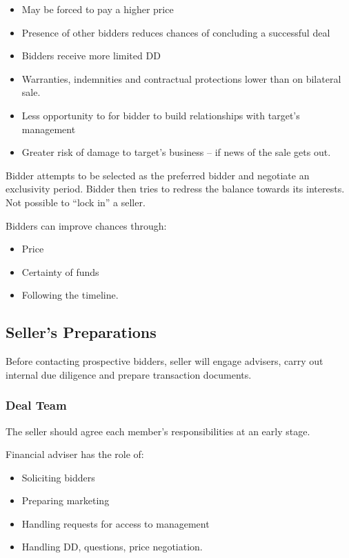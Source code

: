 \documentclass[
]{article}
\providecommand{\tightlist}{%
  \setlength{\itemsep}{0pt}\setlength{\parskip}{0pt}}
\begin{document}
\begin{itemize}
\tightlist
\item
  May be forced to pay a higher price
\item
  Presence of other bidders reduces chances of concluding a successful
  deal
\item
  Bidders receive more limited DD
\item
  Warranties, indemnities and contractual protections lower than on
  bilateral sale.
\item
  Less opportunity to for bidder to build relationships with target's
  management
\item
  Greater risk of damage to target's business -- if news of the sale
  gets out.
\end{itemize}

Bidder attempts to be selected as the preferred bidder and negotiate an
exclusivity period. Bidder then tries to redress the balance towards its
interests. Not possible to ``lock in'' a seller.

Bidders can improve chances through:

\begin{itemize}
\tightlist
\item
  Price
\item
  Certainty of funds
\item
  Following the timeline.
\end{itemize}

\hypertarget{sellers-preparations}{%
\subsection{Seller's Preparations}\label{sellers-preparations}}

Before contacting prospective bidders, seller will engage advisers,
carry out internal due diligence and prepare transaction documents.

\hypertarget{deal-team}{%
\subsubsection{Deal Team}\label{deal-team}}

The seller should agree each member's responsibilities at an early
stage.

Financial adviser has the role of:

\begin{itemize}
\tightlist
\item
  Soliciting bidders
\item
  Preparing marketing
\item
  Handling requests for access to management
\item
  Handling DD, questions, price negotiation.
\end{itemize}
\end{document}
